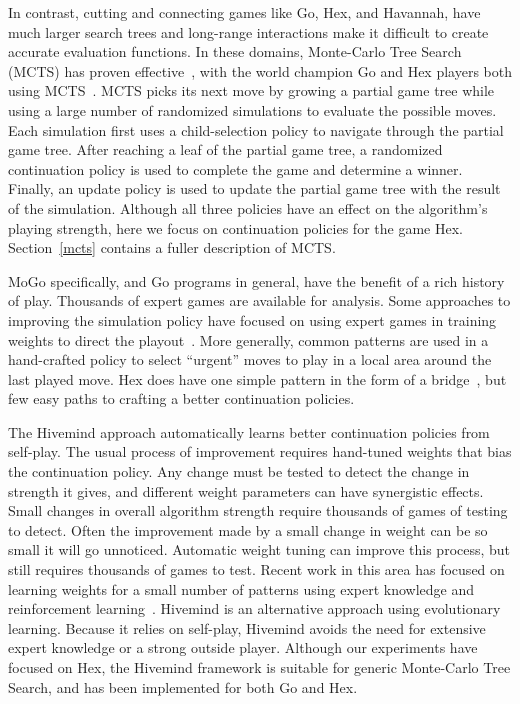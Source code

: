 \documentclass{acm_proc_article-sp}
\begin{document}
In contrast, cutting and connecting games like Go, Hex, and Havannah, have much larger search trees and long-range interactions make it difficult to create accurate evaluation functions.
In these domains, Monte-Carlo Tree Search (MCTS) has proven effective~\cite{}, 
with the world champion Go and Hex players both using MCTS~\cite{}.
MCTS picks its next move by growing a partial game tree while using
a large number of randomized simulations to evaluate the possible moves.
Each simulation first uses a child-selection policy to navigate through the partial game tree.
After reaching a leaf of the partial game tree, a randomized continuation policy is used to complete the game 
and determine a winner.  
Finally, an update policy is used to update the partial game tree with the result of the simulation.
Although all three policies have an effect on the algorithm's playing strength, here we focus on
continuation policies for the game Hex.
Section~\ref{mcts} contains a fuller description of MCTS.

MoGo specifically, and Go programs in general, have the benefit of a rich history of play. Thousands of expert games are available for analysis. Some approaches to improving the simulation policy have focused on using expert games in training weights to direct the playout~\cite{chaslot2010adding}. More generally, common patterns are used in a hand-crafted policy to select ``urgent'' moves to play in a local area around the last played move. Hex does have one simple pattern in the form of a bridge~\cite{anshelevich2002hierarchical}, but few easy paths to crafting a better continuation policies.

The Hivemind approach automatically learns better continuation policies from self-play. 
The usual process of improvement requires hand-tuned weights that bias the continuation policy. 
Any change must be tested to detect the change in strength it gives,
and different weight parameters can have synergistic effects.
Small changes in overall algorithm strength require thousands of games of testing to detect. 
Often the improvement made by a small change in weight can be so small it will go unnoticed. 
Automatic weight tuning can improve this process, but still requires thousands of games to test. 
Recent work in this area has focused on learning weights for a small number of patterns using expert knowledge and reinforcement learning~\cite{silver2009monte}. 
Hivemind is an alternative approach using evolutionary learning. 
Because it relies on self-play, Hivemind avoids the need for extensive expert knowledge or a strong outside player.
Although our experiments have focused on Hex, 
the Hivemind framework is suitable for generic Monte-Carlo Tree Search, and has been implemented for
both Go and Hex.
\end{document}
